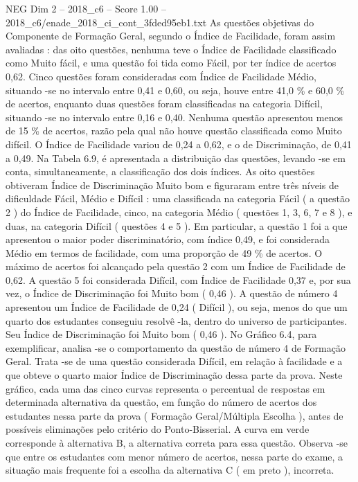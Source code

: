 \begin{textsample}{NEG Dim 2 – 2018\_c6 – Score 1.00 – 2018\_c6/enade\_2018\_ci\_cont\_3fded95eb1.txt}
As questões objetivas do Componente de Formação Geral, segundo o Índice de Facilidade, foram assim avaliadas : das oito questões, nenhuma teve o Índice de Facilidade classificado como Muito fácil, e uma questão foi tida como Fácil, por ter índice de acertos 0,62.
Cinco questões foram consideradas com Índice de Facilidade Médio, situando -se no intervalo entre 0,41 e 0,60, ou seja, houve entre 41,0 \% e 60,0 \% de acertos, enquanto duas questões foram classificadas na categoria Difícil, situando -se no intervalo entre 0,16 e 0,40.
Nenhuma questão apresentou menos de 15 \% de acertos, razão pela qual não houve questão classificada como Muito difícil.
O Índice de Facilidade variou de 0,24 a 0,62, e o de Discriminação, de 0,41 a 0,49.
Na Tabela 6.9, é apresentada a distribuição das questões, levando -se em conta, simultaneamente, a classificação dos dois índices.
As oito questões obtiveram Índice de Discriminação Muito bom e figuraram entre três níveis de dificuldade Fácil, Médio e Difícil : uma classificada na categoria Fácil ( a questão 2 ) do Índice de Facilidade, cinco, na categoria Médio ( questões 1, 3, 6, 7 e 8 ), e duas, na categoria Difícil ( questões 4 e 5 ).
Em particular, a questão 1 foi a que apresentou o maior poder discriminatório, com índice 0,49, e foi considerada Médio em termos de facilidade, com uma proporção de 49 \% de acertos.
O máximo de acertos foi alcançado pela questão 2 com um Índice de Facilidade de 0,62.
A questão 5 foi considerada Difícil, com Índice de Facilidade 0,37 e, por sua vez, o Índice de Discriminação foi Muito bom ( 0,46 ).
A questão de número 4 apresentou um Índice de Facilidade de 0,24 ( Difícil ), ou seja, menos do que um quarto dos estudantes conseguiu resolvê -la, dentro do universo de participantes.
Seu Índice de Discriminação foi Muito bom ( 0,46 ).
No Gráfico 6.4, para exemplificar, analisa -se o comportamento da questão de número 4 de Formação Geral.
Trata -se de uma questão considerada Difícil, em relação à facilidade e a que obteve o quarto maior Índice de Discriminação dessa parte da prova.
Neste gráfico, cada uma das cinco curvas representa o percentual de respostas em determinada alternativa da questão, em função do número de acertos dos estudantes nessa parte da prova ( Formação Geral/Múltipla Escolha ), antes de possíveis eliminações pelo critério do Ponto-Bisserial.
A curva em verde corresponde à alternativa B, a alternativa correta para essa questão.
Observa -se que entre os estudantes com menor número de acertos, nessa parte do exame, a situação mais frequente foi a escolha da alternativa C ( em preto ), incorreta.

\end{textsample}
